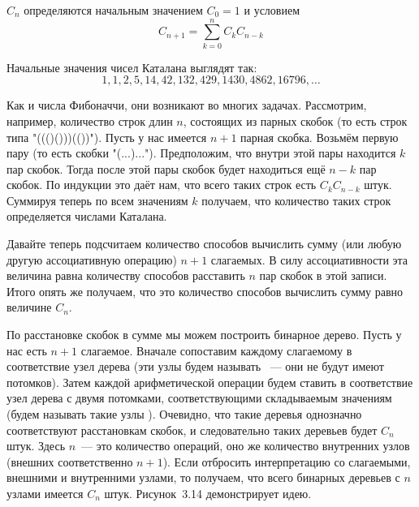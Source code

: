 \begin{definition}
 $C_n$ определяются начальным значением $C_0 = 1$ и условием
$$C_{n+1} = \sum_{k=0}^n C_kC_{n-k}$$
\end{definition}

Начальные значения чисел Каталана выглядят так:
$$1, 1, 2, 5, 14, 42, 132, 429, 1430, 4862, 16796, \ldots$$

Как и числа Фибоначчи, они возникают во многих задачах. Рассмотрим, например, количество строк длин $n$, состоящих из парных скобок (то есть строк типа "((()()))(())"). Пусть у нас имеется $n+1$ парная скобка. Возьмём первую пару (то есть скобки "(...)..."). Предположим, что внутри этой пары находится $k$ пар скобок. Тогда после этой пары скобок будет находиться ещё $n-k$ пар скобок. По индукции это даёт нам, что всего таких строк есть $C_kC_{n-k}$ штук. Суммируя теперь по всем значениям $k$ получаем, что количество таких строк определяется числами Каталана.

Давайте теперь подсчитаем количество способов вычислить сумму (или любую другую ассоциативную операцию) $n+1$ слагаемых. В силу ассоциативности эта величина равна количеству способов расставить $n$ пар скобок в этой записи. Итого опять же получаем, что это количество способов вычислить сумму равно величине $C_n$.

По расстановке скобок в сумме мы можем построить бинарное дерево. Пусть у нас есть $n+1$ слагаемое. Вначале сопоставим каждому слагаемому в соответствие узел дерева (эти узлы будем называть ~--- они не будут имеют потомков). Затем каждой арифметической операции будем ставить в соответствие узел дерева с двумя потомками, соответствующими складываемым значениям (будем называть такие узлы ). Очевидно, что такие деревья однозначно соответствуют расстановкам скобок, и следовательно таких деревьев будет $C_n$ штук. Здесь $n$~--- это количество операций, оно же количество внутренних узлов (внешних соответственно $n+1$). Если отбросить интерпретацию со слагаемыми, внешними и внутренними узлами, то получаем, что всего бинарных деревьев с $n$ узлами имеется $C_n$ штук. Рисунок~3.14 демонстрирует идею.

